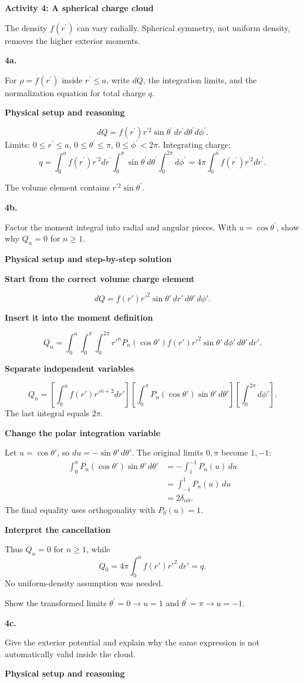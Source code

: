 \documentclass[11pt]{article}
\newcommand{\topic}[1]{\par{\Large\bfseries\color{navy}#1}\par}
\newcommand{\q}[2]{\par\bigskip\noindent\textbf{\color{navy}#1}\par\smallskip #2\par\medskip}
\newcommand{\bridge}[1]{\begin{tcolorbox}[colback=white,colframe=amber,title=Physical starting point,fonttitle=\bfseries,boxrule=.5pt,breakable]#1\end{tcolorbox}}
\newcommand{\stage}[1]{\par\medskip\noindent\textbf{\color{blue}#1}\par\smallskip}
\newcommand{\connect}[1]{\begin{tcolorbox}[colback=blue!4,colframe=blue!45,title=Keep the thread,fonttitle=\bfseries,boxrule=.45pt,breakable]#1\end{tcolorbox}}
\begin{document}
\newpage
\topic{Activity 4: A spherical charge cloud}
\bridge{The density $f(r^\prime)$ can vary radially. Spherical symmetry, not uniform density, removes the higher exterior moments.}

\q{4a.}{For $\rho=f(r^\prime)$ inside $r^\prime\le a$, write $dQ$, the integration limits, and the normalization equation for total charge $q$.}
\stage{Physical setup and reasoning}


\[dQ=f(r^\prime)r^{\prime2}\sin\theta^\prime\,dr^\prime d\theta^\prime d\phi^\prime.\]
 Limits: $0\le r^\prime\le a$, $0\le\theta^\prime\le\pi$, $0\le\phi^\prime<2\pi$. Integrating charge: 
\[q=\int_0^a f(r^\prime)r^{\prime2}dr^\prime\int_0^\pi\sin\theta^\prime d\theta^\prime\int_0^{2\pi}d\phi^\prime=4\pi\int_0^a f(r^\prime)r^{\prime2}dr^\prime.\]

\connect{The volume element contains $r^{\prime2}\sin\theta^\prime$.}

\q{4b.}{Factor the moment integral into radial and angular pieces. With $u=\cos\theta^\prime$, show why $Q_n=0$ for $n\ge1$.}
\stage{Physical setup and step-by-step solution}

\stage{Start from the correct volume charge element}
\[dQ=f(r')r'^2\sin\theta'\,dr'\,d\theta'\,d\phi'.\]
\stage{Insert it into the moment definition}
\[Q_n=\int_0^a\!\int_0^\pi\!\int_0^{2\pi}r'^nP_n(\cos\theta')f(r')r'^2\sin\theta'\,d\phi'\,d\theta'\,dr'.\]
\stage{Separate independent variables}
\[Q_n=\left[\int_0^af(r')r'^{n+2}dr'\right]\left[\int_0^\pi P_n(\cos\theta')\sin\theta'\,d\theta'\right]\left[\int_0^{2\pi}d\phi'\right].\]
The last integral equals $2\pi$.
\stage{Change the polar integration variable}
Let $u=\cos\theta'$, so $du=-\sin\theta'\,d\theta'$. The original limits $0,\pi$ become $1,-1$:
\begin{align*}\int_0^\pi P_n(\cos\theta')\sin\theta'\,d\theta'&=-\int_1^{-1}P_n(u)\,du\\&=\int_{-1}^1P_n(u)\,du\\&=2\delta_{n0}.\end{align*}
The final equality uses orthogonality with $P_0(u)=1$.
\stage{Interpret the cancellation}
Thus $Q_n=0$ for $n\ge1$, while
\[Q_0=4\pi\int_0^af(r')r'^2\,dr'=q.\]
No uniform-density assumption was needed.
\connect{Show the transformed limits $\theta^\prime=0\to u=1$ and $\theta^\prime=\pi\to u=-1$.}

\q{4c.}{Give the exterior potential and explain why the same expression is not automatically valid inside the cloud.}
\stage{Physical setup and reasoning}
\end{document}
